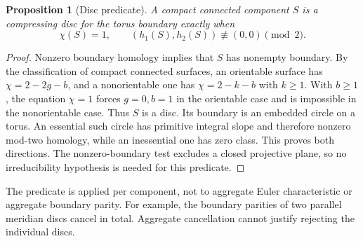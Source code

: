 \documentclass[11pt]{article}
\newtheorem{proposition}[theorem]{Proposition}
\theoremstyle{definition}\newtheorem{definition}[theorem]{Definition}
\theoremstyle{remark}\newtheorem{remark}[theorem]{Remark}
\begin{document}
\begin{proposition}[Disc predicate]
\label{prop:disc}
A compact connected component $S$ is a compressing disc for the torus boundary
exactly when
\begin{equation}
 \chi(S)=1,\qquad (h_1(S),h_2(S))\not\equiv(0,0)\pmod2.
 \label{eq:disc}
\end{equation}
\end{proposition}
\begin{proof}
Nonzero boundary homology implies that $S$ has nonempty boundary. By the
classification of compact connected surfaces, an orientable surface has
$\chi=2-2g-b$, and a nonorientable one has $\chi=2-k-b$ with $k\ge1$.
With $b\ge1$, the equation $\chi=1$ forces $g=0,b=1$ in the orientable case
and is impossible in the nonorientable case. Thus $S$ is a disc. Its boundary is
an embedded circle on a torus. An essential such circle has primitive integral
slope and therefore nonzero mod-two homology, while an inessential one has zero
class. This proves both directions. The nonzero-boundary test excludes a closed
projective plane, so no irreducibility hypothesis is needed for this predicate.
\end{proof}

The predicate is applied per component, not to aggregate Euler characteristic
or aggregate boundary parity. For example, the boundary parities of two parallel
meridian discs cancel in total. Aggregate cancellation cannot justify rejecting
the individual discs.
\end{document}
